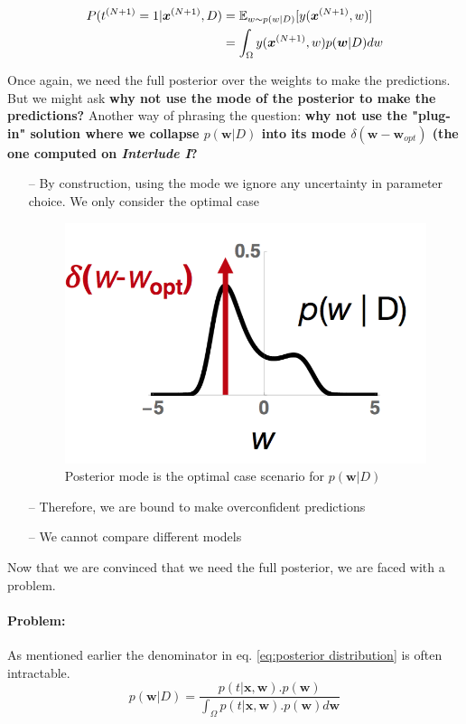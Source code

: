 \documentclass[main]{subfiles}
\begin{document}
\begin{equation}
    \begin{split}
        P(t^{(N+1)} = 1 |\bm{x}^{(N+1)}, D) &= \operatorname{\mathbb{E}}_{w \sim p(w|D)}[y(\bm{x}^{(N+1)},w)] \\
    &=\int_{\Omega} y(\bm{x}^{(N+1)},w) p(\bm{w}|D) dw
    \end{split}
    \label{eq:prediction}
\end{equation}

\noindent Once again, we need the full posterior over the weights to make the predictions. But we might ask \textbf{why not use the mode of the posterior to make the predictions?}
\noindent
Another way of phrasing the question: \textbf{why not use the "plug-in" solution where we collapse $p(\bm{w}|D)$ into its mode $\delta(\bm{w}-\bm{w}_{opt})$ (the one computed on \textit{Interlude I}?}

\begin{itemize}
    \item[--] By construction, using the mode we ignore any uncertainty in parameter choice. We only consider the optimal case
    \begin{figure}[H]
    	\centering
    	\includegraphics[width=0.6\linewidth]{05_LearningAsBayesianInference/figures/posteriormode_delta.png}
    	\caption{Posterior mode is the optimal case scenario for $p(\bm{w}|D)$}
    	\label{fig:posterior_mode_delta}
    \end{figure}

    \item[--] Therefore, we are bound to make overconfident predictions
    \item[--] We cannot compare different models 
\end{itemize}

\noindent Now that we are convinced that we need the full posterior, we are faced with a problem.
\paragraph{Problem:}As mentioned earlier  the denominator in eq. \ref{eq:posterior distribution} is often intractable. 
\begin{equation*}
    p(\bm{w}|D) = \frac{p(t|\bm{x},\bm{w}).p(\bm{w})}{\int_\Omega p(t|\bm{x},\bm{w}). p(\bm{w}) d\bm{w}}
\end{equation*}
 
\end{document}
